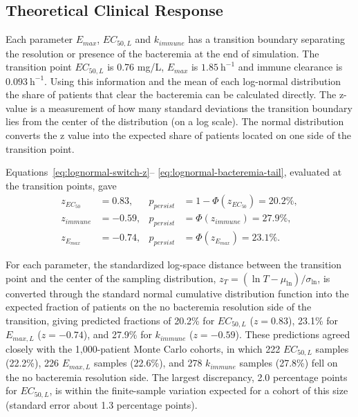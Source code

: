\documentclass[12pt, draftcls, onecolumn]{IEEEtran}
\begin{document}
\subsection{Theoretical Clinical Response}

Each parameter $E_{max}$, $EC_{50,L}$ and $k_{immune}$ has a transition boundary separating the resolution or presence of the bacteremia at the end of simulation.
The transition point $EC_{50,L}$ is 0.76 mg/L, $E_{max}$ is $1.85~\mathrm{h}^{-1}$ and immune clearance is  $0.093~\mathrm{h}^{-1}$.  Using this information and the mean of each log-normal distribution the share of patients that clear the bacteremia can be calculated directly.  The z-value is a measurement of how many standard deviations the transition boundary lies 
from the center of the distribution (on a log scale).  The normal distribution converts the z value into the expected share of patients located on one side of the transition point.  

Equations~\eqref{eq:lognormal-switch-z}--
\eqref{eq:lognormal-bacteremia-tail}, evaluated at the 
transition points, gave
\begin{equation}
\begin{aligned}
z_{EC_{50}} &= 0.83,  & p_{persist} &= 1-\Phi(z_{EC_{50}})=20.2\%,\\
z_{immune} &= -0.59, & p_{persist} &= \Phi(z_{immune})=27.9\%,\\
z_{E_{max}} &= -0.74, &
p_{persist} &= \Phi(z_{E_{max}})=23.1\%.
\end{aligned}
\label{eq:evaluated-persistence-tails}
\end{equation}

For each parameter, the standardized log-space distance between the transition point and the center of the sampling distribution, $z_T = (\ln T - \mu_{\ln})/\sigma_{\ln}$, is converted through the standard normal cumulative distribution function into the expected fraction of patients on the no bacteremia resolution side of the transition, giving predicted fractions of 20.2\% for $EC_{50,L}$ ($z = 0.83$), 23.1\% for $E_{max,L}$ ($z = -0.74$), and
27.9\% for $k_{immune}$ ($z = -0.59$). These predictions agreed closely with the 1,000-patient Monte Carlo cohorts, in which 222 $EC_{50,L}$ samples (22.2\%), 226 $E_{max,L}$ samples (22.6\%), and 278 $k_{immune}$ samples (27.8\%) fell on the no bacteremia resolution side. The largest discrepancy, 2.0 percentage points for $EC_{50,L}$, is within the finite-sample variation expected for a cohort of this size (standard error about 1.3 percentage points).
\end{document}
